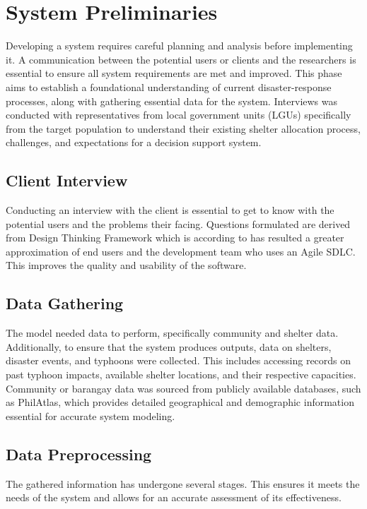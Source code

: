 \section{System Preliminaries}
	Developing a system requires careful planning and analysis before implementing it. A communication between the potential users or clients and the researchers is essential to ensure all system requirements are met and improved. This phase aims to establish a foundational understanding of current disaster-response processes, along with gathering essential data for the system. Interviews was conducted with representatives from local government units (LGUs) specifically from the target population to understand their existing shelter allocation process, challenges, and expectations for a decision support system. 
	
\subsection{Client Interview}
	Conducting an interview with the client is essential to get to know with the potential users and the problems their facing. Questions formulated are derived from Design Thinking Framework which is according to \textcite{Julio2018} has resulted a greater approximation of end users and the development team who uses an Agile SDLC. This improves the quality and usability of the software.
	
\subsection{Data Gathering}
	The model needed data to perform, specifically community and shelter data. Additionally, to ensure that the system produces outputs, data on shelters, disaster events, and typhoons were collected. This includes accessing records on past typhoon impacts, available shelter locations, and their respective capacities. Community or barangay data was sourced from publicly available databases, such as PhilAtlas, which provides detailed geographical and demographic information essential for accurate system modeling.
	
\subsection{Data Preprocessing}
	The gathered information has undergone several stages. This ensures it meets the needs of the system and allows for an accurate assessment of its effectiveness.
	
